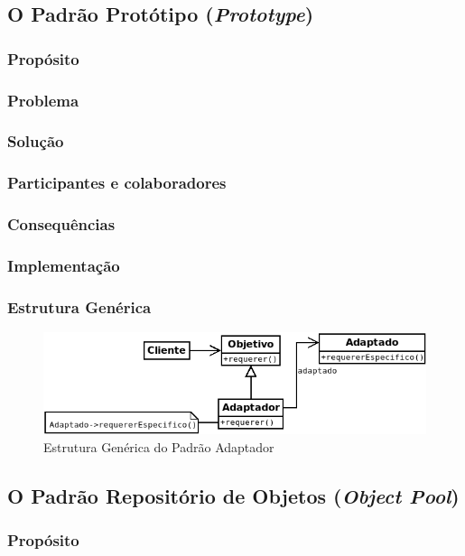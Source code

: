 \subsection{O Padrão Protótipo (\textit{Prototype})}
\subsubsection{Propósito}
\subsubsection{Problema}
\subsubsection{Solução}
\subsubsection{Participantes e colaboradores}
\subsubsection{Consequências}
\subsubsection{Implementação}
\subsubsection{Estrutura Genérica}

\begin{figure}[h]
\begin{center}
\includegraphics[scale=0.6]{adaptador.png}
\caption{Estrutura Genérica do Padrão Adaptador}\label{fig:adaptador}
\end{center}
\end{figure}

\subsection{O Padrão Repositório de Objetos (\textit{Object Pool})}
\subsubsection{Propósito}
